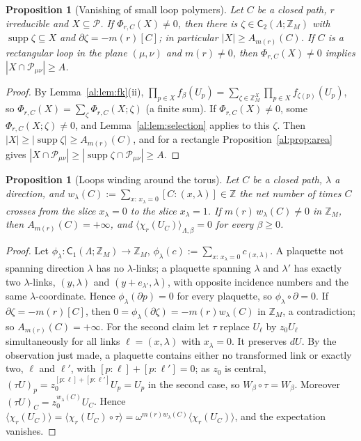 \documentclass[11pt,a4paper]{article}
\newtheorem{proposition}[theorem]{Proposition}
\theoremstyle{definition}
\theoremstyle{remark}
\DeclareMathOperator{\supp}{supp}
\newcommand{\Z}{\mathbb{Z}}
\newcommand{\cP}{\mathcal{P}}
\newcommand{\sC}{\mathsf{C}}
\begin{document}
\begin{proposition}[Vanishing of small loop polymers]\label{al:prop:vanish}
Let $C$ be a closed path, $r$ irreducible and $X\subseteq\cP$. If $\Phi_{r,C}(X)\neq0$, then there is
$\zeta\in\sC_2(\Lambda;\Z_M)$ with $\supp\zeta\subseteq X$ and $\partial\zeta=-m(r)[C]$; in particular
$|X|\ge A_{m(r)}(C)$. If $C$ is a rectangular loop in the plane $(\mu,\nu)$ and $m(r)\neq0$, then $\Phi_{r,C}(X)\neq0$
implies $|X\cap\cP_{\mu\nu}|\ge A$.
\end{proposition}

\begin{proof}
By Lemma~\ref{al:lem:fk}(ii), $\prod_{p\in X}f_\beta(U_p)=\sum_{\zeta\in\Z_M^X}\prod_{p\in X}f_{\zeta(p)}(U_p)$, so
$\Phi_{r,C}(X)=\sum_\zeta\Phi_{r,C}(X;\zeta)$ (a finite sum). If $\Phi_{r,C}(X)\ne0$, some $\Phi_{r,C}(X;\zeta)\neq0$,
and Lemma~\ref{al:lem:selection} applies to this $\zeta$. Then $|X|\ge|\supp\zeta|\ge A_{m(r)}(C)$, and for a
rectangle Proposition~\ref{al:prop:area} gives $|X\cap\cP_{\mu\nu}|\ge|\supp\zeta\cap\cP_{\mu\nu}|\ge A$.
\end{proof}

\begin{proposition}[Loops winding around the torus]\label{al:prop:winding}
Let $C$ be a closed path, $\lambda$ a direction, and $w_\lambda(C):=\sum_{x:\,x_\lambda=0}[C:(x,\lambda)]\in\Z$ the net
number of times $C$ crosses from the slice $x_\lambda=0$ to the slice $x_\lambda=1$. If $m(r)\,w_\lambda(C)\neq0$ in
$\Z_M$, then $A_{m(r)}(C)=+\infty$, and $\langle\chi_r(U_C)\rangle_{\Lambda,\beta}=0$ for every $\beta\ge0$.
\end{proposition}

\begin{proof}
Let $\phi_\lambda:\sC_1(\Lambda;\Z_M)\to\Z_M$, $\phi_\lambda(c):=\sum_{x:\,x_\lambda=0}c_{(x,\lambda)}$. A plaquette not
spanning direction $\lambda$ has no $\lambda$-links; a plaquette spanning $\lambda$ and $\lambda'$ has exactly two
$\lambda$-links, $(y,\lambda)$ and $(y+e_{\lambda'},\lambda)$, with opposite incidence numbers and the same
$\lambda$-coordinate. Hence $\phi_\lambda(\partial p)=0$ for every plaquette, so $\phi_\lambda\circ\partial=0$. If
$\partial\zeta=-m(r)[C]$, then $0=\phi_\lambda(\partial\zeta)=-m(r)w_\lambda(C)$ in $\Z_M$, a contradiction; so
$A_{m(r)}(C)=+\infty$. For the second claim let $\tau$ replace $U_\ell$ by $z_0U_\ell$ simultaneously for all links
$\ell=(x,\lambda)$ with $x_\lambda=0$. It preserves $dU$. By the observation just made, a plaquette contains either
no transformed link or exactly two, $\ell$ and $\ell'$, with $[p:\ell]+[p:\ell']=0$; as $z_0$ is central,
$(\tau U)_p=z_0^{[p:\ell]+[p:\ell']}U_p=U_p$ in the second case, so $W_\beta\circ\tau=W_\beta$. Moreover
$(\tau U)_C=z_0^{w_\lambda(C)}U_C$. Hence
$\langle\chi_r(U_C)\rangle=\langle\chi_r(U_C)\circ\tau\rangle=\omega^{m(r)w_\lambda(C)}\langle\chi_r(U_C)\rangle$, and the
expectation vanishes.
\end{proof}
\end{document}
